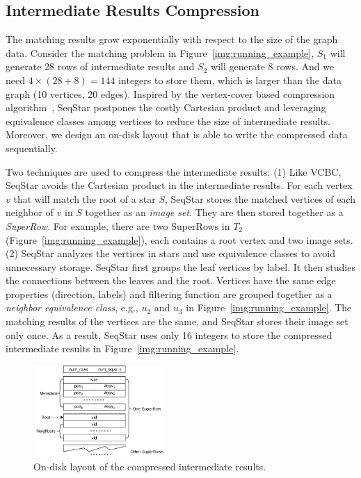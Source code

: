 \subsection{Intermediate Results Compression}\label{sec:match_compress}
The matching results grow exponentially with respect to the size of the graph data.
Consider the matching problem in Figure~\ref{img:running_example},
$S_1$ will generate 28 rows of intermediate results and $S_2$ will generate 8 rows.
And we need $4 \times (28 + 8) = 144$ integers to store them, which is larger than the data graph (10 vertices, 20 edges).
Inspired by the vertex-cover based compression algorithm~\cite{DBLP:journals/pvldb/QiaoZC17},
SeqStar postpones the costly Cartesian product and leveraging equivalence classes among vertices to reduce the size of intermediate results.
Moreover, we design an on-disk layout that is able to write the compressed data sequentially.

Two techniques are used to compress the intermediate results:
(1) Like VCBC, SeqStar avoids the Cartesian product in the intermediate results.
For each vertex $v$ that will match the root of a star $S$,
SeqStar stores the matched vertices of each neighbor of $v$ in $S$ together as an \emph{image set}.
They are then stored together as a \emph{SuperRow}.
For example, there are two SuperRows in $T_2$ (Figure~\ref{img:running_example}),
each contains a root vertex and two image sets.
(2) SeqStar analyzes the vertices in stars and use equivalence classes to avoid unnecessary storage.
SeqStar first groups the leaf vertices by label.
It then studies the connections between the leaves and the root.
Vertices have the same edge properties (direction, labels) and filtering function are grouped together as a \emph{neighbor equivalence class},
e.g., $u_2$ and $u_3$ in Figure~\ref{img:running_example}.
The matching results of the vertices are the same, and SeqStar stores their image set only once.
As a result, SeqStar uses only 16 integers to store the compressed intermediate results in Figure~\ref{img:running_example}.
\begin{figure}[ht]
  \centering
  \includegraphics[width=0.45\textwidth]{img/compress.pdf}
  \caption{On-disk layout of the compressed intermediate results.}\label{img:compress}
\end{figure}

